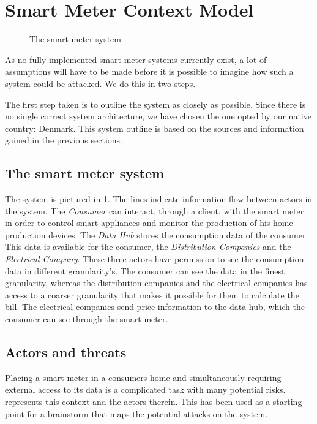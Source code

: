 \section{Smart Meter Context Model}\label{sec:smartmetercontext}

\begin{figure}[h]
  \centering
  
  \caption{The smart meter system\cite{tdlm}}
  \label{contextual:system}
\end{figure}

As no fully implemented smart meter systems currently exist, a lot of assumptions will have to be made before it is possible to imagine how such a system could be attacked.
We do this in two steps.

The first step taken is to outline the system as closely as possible.
Since there is no single correct system architecture, we have chosen the one opted by our native country: Denmark.
This system outline is based on the sources and information gained in the previous sections.

\subsection{The smart meter system}
The system is pictured in \cref{contextual:system}.
The lines indicate information flow between actors in the system.
The \textit{Consumer} can interact, through a client, with the smart meter in order to control smart appliances and monitor the production of his home production devices.
The \textit{Data Hub} stores the consumption data of the consumer.
This data is available for the consumer, the \textit{Distribution Companies} and the \textit{Electrical Company}.
These three actors have permission to see the consumption data in different granularity's.
The consumer can see the data in the finest granularity, whereas the distribution companies and the electrical companies has access to a coarser granularity that makes it possible for them to calculate the bill.
The electrical companies send price information to the data hub, which the consumer can see through the smart meter.

\subsection{Actors and threats}
Placing a smart meter in a consumers home and simultaneously requiring external access to its data is a complicated task with many potential risks.
 represents this context and the actors therein.
This has been used as a starting point for a brainstorm that maps the potential attacks on the system.

